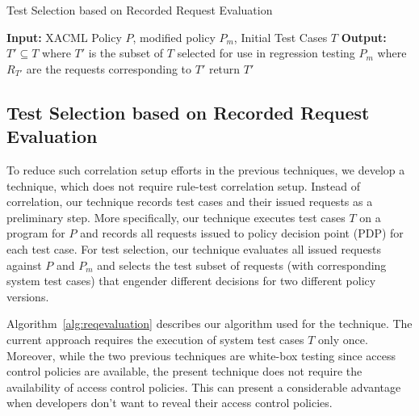 \begin{algorithmic}
\begin{algorithm}[t]
\caption{\label{alg:reqevaluation}Test Selection based on Recorded Request Evaluation}
\STATE \textbf{Input:} XACML Policy $P$, modified policy $P_{m}$, Initial Test Cases $T$
\STATE \textbf{Output:} $T' \subseteq T$ where $T'$ is the subset of $T$ selected for use in regression testing $P_{m}$
 where $R_{T'}$ are the requests corresponding to $T'$ 
\ENDIF
\ENDFOR
{}
\STATE return $T'$
\end{algorithm}
\end{algorithmic}

\subsection{Test Selection based on Recorded Request Evaluation}
To reduce such correlation setup efforts in the previous techniques, we develop
a technique, which does not require rule-test correlation setup.
Instead of correlation, our technique records test cases and their issued requests as a preliminary step.
More specifically, our technique executes test cases $T$ on a program for $P$ and records all requests issued to policy decision point (PDP) for each test case. For test selection, our technique evaluates all issued requests against $P$ and $P_m$ and selects the test subset of
requests (with corresponding system test cases) that engender different decisions for two different policy versions.

Algorithm~\ref{alg:reqevaluation} describes our algorithm used for the technique.
The current approach requires the execution of system test cases $T$ only once.
Moreover, while the two previous techniques are white-box testing since access control policies are available, the present technique 
does not require the availability of access control policies. This can present a considerable advantage when developers don't want 
to reveal their access control policies.


